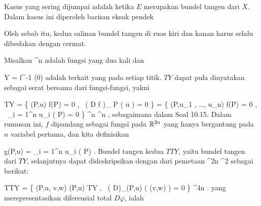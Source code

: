 Kasus yang sering dijumpai adalah ketika $E$ merupakan bundel tangen dari $X$. Dalam kasus ini diperoleh barisan eksak pendek

 {  }

Oleh sebab itu, kedua salinan bundel tangen di ruas kiri dan kanan harus selalu dibedakan dengan cermat.

{}
{

Misalkan
 {\R^n } { \R
} {}
adalah fungsi yang dua kali
dan

\mavergleichskette
{\vergleichskette
{ Y
}
{ = }{ f^{-1} (0)
}
{  }{
}
{    }{
}
{   }{
}
}
{}{}{}
adalah
terkait yang
pada setiap titik.
$TY$ dapat pula dinyatakan sebagai serat bersama dari fungsi-fungsi, yakni

\mavergleichskettealignhandlinks
{\vergleichskettealignhandlinks
{ TY
}
{ =} { \left\{  (P,u)   \mid   f(P) = 0 , \,  \left(  D f   \right)_{ P } \left(  u  \right) = 0       \right\}
}
{ =} { \left\{  (P,u_1 , \ldots , u_n)   \mid   f(P) = 0 , \,  \sum_{i = 1}^n u_i {  } ( P) = 0       \right\}
}
{ \subseteq} { \R^n \times \R^n
}
{ } {
}
}
{}
{}{,}
sebagaimana dalam
Soal 10.15.
Dalam rumusan ini, $f$ dipandang sebagai fungsi pada ${\mathbb R}^{2n}$ yang hanya bergantung pada $n$ variabel pertama, dan kita definisikan

\mavergleichskettedisp
{\vergleichskette
{ g(P,u)
}
{ =} { \sum_{i = 1}^n u_i {  } ( P)
}
{ } {
}
{ } {
}
{ } {
}
}
{}{}{.}
Bundel tangen kedua $TTY$, yaitu bundel tangen dari $TY$, selanjutnya dapat dideskripsikan dengan
dari pemetaan
 {\R^{2n}} { \R^2
} {}
sebagai berikut:

\mavergleichskettealignhandlinks
{\vergleichskettealignhandlinks
{ TTY
}
{ =} { \left\{  (P,u, v,w)  \mid   (P,u) \in TY , \,  \left(  D\varphi  \right)_{(P,u)} \left(  (v,w)  \right) = 0       \right\}
}
{ \subseteq} { \R^{4n}
}
{ } {
}
{ } {}
}
{}
{}{.}
yang merepresentasikan diferensial total $D\varphi$, ialah

}
